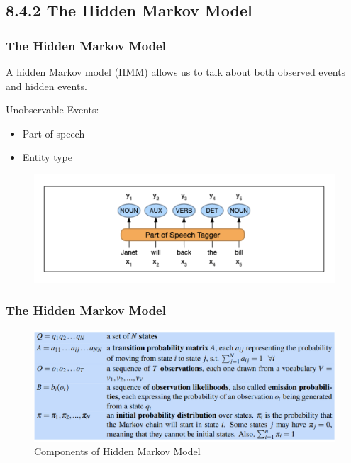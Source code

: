 \documentclass[13.5pt,aspecratio=169]{beamer}
\begin{document}
\begin{frame}
\begin{minipage}{0.49\textwidth}
\begin{itemize}
            \end{itemize}

        \end{minipage}
        
\end{frame}
\subsection{8.4.2 The Hidden Markov Model}

\begin{frame}
\onehalfspacing
	\frametitle{The Hidden Markov Model}
        \begin{block}{}
            A hidden Markov model (HMM) allows us to talk about both observed events and hidden events.
        \end{block}

        {\large{Unobservable Events:}
        \begin{itemize}
            \item Part-of-speech
            \item Entity type
        \end{itemize}   
        }
        \begin{figure}
            \centering
            \includegraphics [scale=0.7] {POS_Tagger.png}
        \end{figure}
	
\end{frame}

\begin{frame}
    \onehalfspacing
        \frametitle{The Hidden Markov Model}
            \begin{figure}[h]
                \centering
                \includegraphics[scale=0.45]{HMM_components.png}
                \caption{ Components of Hidden Markov Model}
            \end{figure}
        
    \end{frame}
\end{document}
